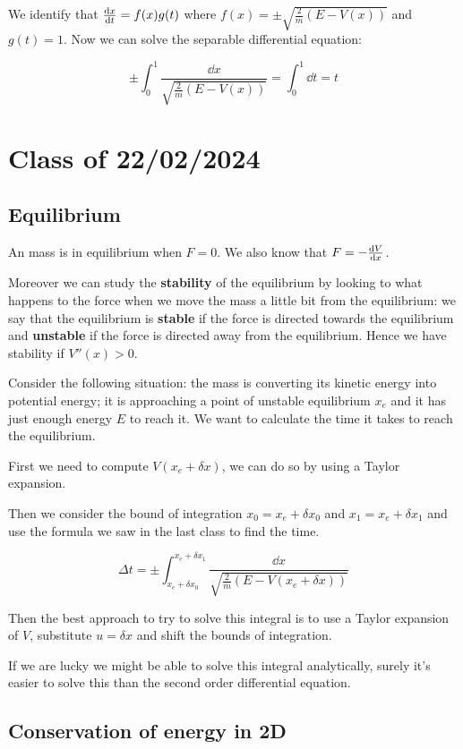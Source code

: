 \documentclass[10pt]{extarticle}
\begin{document}
We identify that $\dv{x}{t} = f(x)g(t)$ where $f(x) = \pm \sqrt{\frac{2}{m} (E - V(x))}$ and $g(t) = 1$.
Now we can solve the separable differential equation:

$$
    \pm \int_0^1 \frac{\dd{x}}{\sqrt{\frac{2}{m} (E - V(x))}} = \int_0^1 \dd{t} = t
$$

\section{Class of 22/02/2024}

\subsection{Equilibrium}

An mass is in equilibrium when $F = 0$.
We also know that $F = -\dv{V}{x}$.

Moreover we can study the \textbf{stability} of the equilibrium by looking to what happens to the force when we move the mass a little bit from the equilibrium:
we say that the equilibrium is \textbf{stable} if the force is directed towards the equilibrium and \textbf{unstable} if the force is directed away from the equilibrium. Hence we have stability if $V''(x) > 0$.

Consider the following situation:
the mass is converting its kinetic energy into potential energy; it is approaching a point of unstable equilibrium $x_e$ and it has just enough energy $E$ to reach it.
We want to calculate the time it takes to reach the equilibrium.

First we need to compute $V(x_e + \delta x)$, we can do so by using a Taylor expansion.

Then we consider the bound of integration $x_0 = x_e + \delta x_0$ and $x_1 = x_e + \delta x_1$ and use the formula we saw in the last class to find the time.

$$
    \Delta t = \pm \int_{x_e + \delta x_0}^{x_e + \delta x_1} \frac{\dd{x}}{\sqrt{\frac{2}{m} (E - V(x_e + \delta x))}}
$$

Then the best approach to try to solve this integral is to use a Taylor expansion of $V$, substitute $u = \delta x$ and shift the bounds of integration.

If we are lucky we might be able to solve this integral analytically, surely it's easier to solve this than the second order differential equation.

\subsection{Conservation of energy in 2D}
\end{document}
